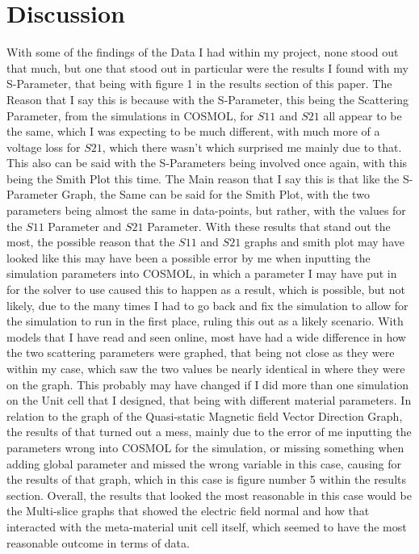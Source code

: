 \documentclass[]{article}
\begin{document}
\section{Discussion}
With some of the findings of the Data I had within my project, none stood out that much, but one that stood out in particular were the results I found with my S-Parameter, that being with figure 1 in the results section of this paper. The Reason that I say this is because with the S-Parameter, this being the Scattering Parameter, from the simulations in COSMOL, for $S11$ and $S21$ all appear to be the same, which I was expecting to be much different, with much more of a voltage loss for $S21$, which there wasn't which surprised me mainly due to that. This also can be said with the S-Parameters being involved once again, with this being the Smith Plot this time. The Main reason that I say this is that like the S-Parameter Graph, the Same can be said for the Smith Plot, with the two parameters being almost the same in data-points, but rather, with the values for the $S11$ Parameter and $S21$ Parameter. With these results that stand out the most, the possible reason that the $S11$ and $S21$ graphs and smith plot may have looked like this may have been a possible error by me when inputting the simulation parameters into COSMOL, in which a parameter I may have put in for the solver to use caused this to happen as a result, which is possible, but not likely, due to the many times I had to go back and fix the simulation to allow for the simulation to run in the first place, ruling this out as a likely scenario. With models that I have read and seen online, most have had a wide difference in how the two scattering parameters were graphed, that being not close as they were within my case, which saw the two values be nearly identical in where they were on the graph. This probably may have changed if I did more than one simulation on the Unit cell that I designed, that being with different material parameters. In relation to the graph of the Quasi-static Magnetic field Vector Direction Graph, the results of that turned out a mess, mainly due to the error of me inputting the parameters wrong into COSMOL for the simulation, or missing something when adding global parameter and missed the wrong variable in this case, causing for the results of that graph, which in this case is figure number 5 within the results section. Overall, the results that looked the most reasonable in this case would be the Multi-slice graphs that showed the electric field normal and how that interacted with the meta-material unit cell itself, which seemed to have the most reasonable outcome in terms of data.
\end{document}
